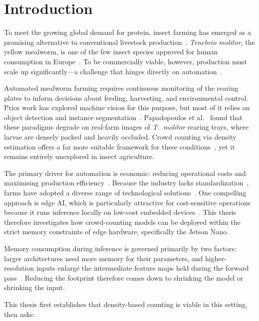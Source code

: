 \documentclass[conference]{IEEEtran}
\begin{document}
\section{Introduction}
To meet the growing global demand for protein, insect farming has emerged as a
promising alternative to conventional livestock production~\cite{vanhuis2013}.
\textit{Tenebrio molitor}, the yellow mealworm, is one of the few insect species
approved for human consumption in Europe~\cite{eu2021tenebrio}. To be
commercially viable, however, production must scale up significantly---a challenge
that hinges directly on automation~\cite{rumpold2013}.

Automated mealworm farming requires continuous monitoring of the rearing plates
to inform decisions about feeding, harvesting, and environmental control. Prior work has explored machine vision for this purpose, but most of it relies on object detection and instance segmentation~\cite{majewski2022multipurpose}. Papadopoulos et al.~\cite{Papadopoulos2024TenebrioVision} found that these
paradigms degrade on real-farm images of \textit{T.\ molitor} rearing trays, where larvae are densely packed and heavily occluded. Crowd counting via density estimation offers a far more suitable framework for these
conditions~\cite{Sindagi2017ASO}, yet it remains entirely unexplored in insect
agriculture.

The primary driver for automation is economic: reducing operational costs and
maximising production efficiency~\cite{rumpold2013}. Because the industry lacks
standardization~\cite{NAWOYA2024108503}, farms have adopted a diverse range of
technological solutions~\cite{CoRoSect2022AdvancedArchitecture,
kroncke2020automation}. One compelling approach is edge AI, which is
particularly attractive for cost-sensitive operations because it runs inference
locally on low-cost embedded devices~\cite{angulo2025realtimecricketsortingsex}.
This thesis therefore investigates how crowd-counting models can be deployed
within the strict memory constraints of edge hardware, specifically the Jetson Nano. 

Memory consumption during inference is governed primarily by two factors:
larger architectures need more memory for their parameters, and
higher-resolution inputs enlarge the intermediate feature maps held during the
forward pass~\cite{Chao2019HarDNet}. Reducing the footprint therefore comes down
to shrinking the model or shrinking the input.

This thesis first establishes that density-based counting is viable in this
setting, then asks:
\end{document}
